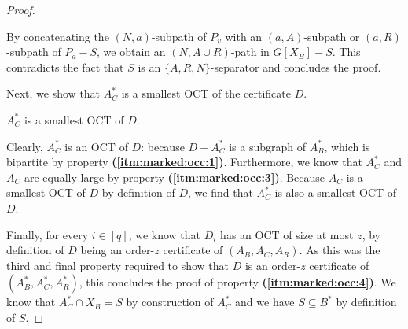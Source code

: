\begin{proof}
\begin{claimproof}
		By concatenating the $(N, a)$-subpath of $P_v$ with an $(a,A)$-subpath or $(a,R)$-subpath of $P_a - S$, we obtain an $(N, A \cup R)$-path in $G[X_B] - S$. This contradicts the fact that $S$ is an $\{A, R, N\}$-separator and concludes the proof.
	\end{claimproof}
	Next, we show that $A_C^\ast$ is a smallest OCT of the certificate $D$.
	\begin{claim}
		$A_C^\ast$ is a smallest OCT of $D$.
	\end{claim}
	\begin{claimproof}
		Clearly, $A_C^\ast$ is an OCT of $D$: because $D - A_C^\ast$ is a subgraph of $A_B^\ast$, which is bipartite by property \textbf{(\ref{itm:marked:occ:1})}. Furthermore, we know that $A_C^\ast$ and $A_C$ are equally large by property \textbf{(\ref{itm:marked:occ:3})}. Because $A_C$ is a smallest OCT of $D$ by definition of $D$, we find that $A_C^\ast$ is also a smallest OCT of $D$.
	\end{claimproof}
	Finally, for every $i \in [q]$, we know that $D_i$ has an OCT of size at most $z$, by definition of $D$ being an order-$z$ certificate of $(A_B, A_C, A_R)$. 
	As this was the third and final property required to show that $D$ is an order-$z$ certificate of $(A_B^\ast, A_C^\ast, A_R^\ast)$, this concludes the proof of property \textbf{(\ref{itm:marked:occ:4})}.
	 We know that $A_C^\ast \cap X_B = S$ by construction of $A_C^\ast$ and we  have $S \subseteq B^\ast$ by definition of $S$.
\end{proof}